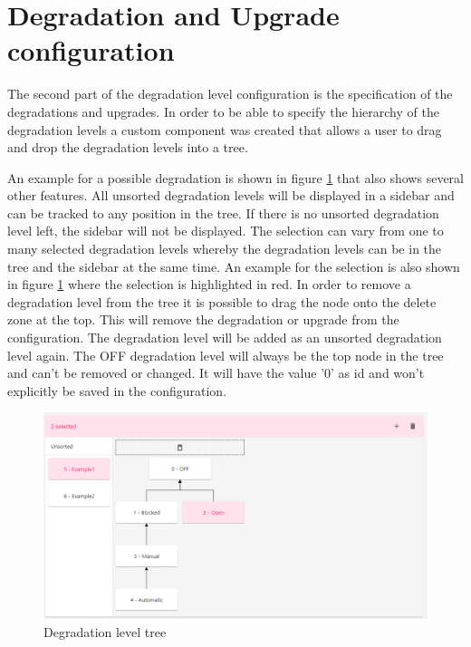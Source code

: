 \section{Degradation and Upgrade configuration}
\label{sec:deg_and_upg}

The second part of the degradation level configuration is the specification of the degradations and upgrades. In order to be able to specify the hierarchy of the degradation levels a custom component was created that allows a user to drag and drop the degradation levels into a tree.

An example for a possible degradation is shown in figure \ref{fig:degradation_level_tree} that also shows several other features. All unsorted degradation levels will be displayed in a sidebar and can be tracked to any position in the tree. If there is no unsorted degradation level left, the sidebar will not be displayed. The selection can vary from one to many selected degradation levels whereby the degradation levels can be in the tree and the sidebar at the same time. An example for the selection is also shown in figure \ref{fig:degradation_level_tree} where the selection is highlighted in red. In order to remove a degradation level from the tree it is possible to drag the node onto the delete zone at the top. This will remove the degradation or upgrade from the configuration. The degradation level will be added as an unsorted degradation level again. The OFF degradation level will always be the top node in the tree and can't be removed or changed. It will have the value '0' as id and won't explicitly be saved in the configuration.

\begin{figure}[ht]
    \centering
    \includegraphics[width=\textwidth]{img/degradation_tree.png}
    \caption{Degradation level tree}
    \label{fig:degradation_level_tree}
\end{figure}

